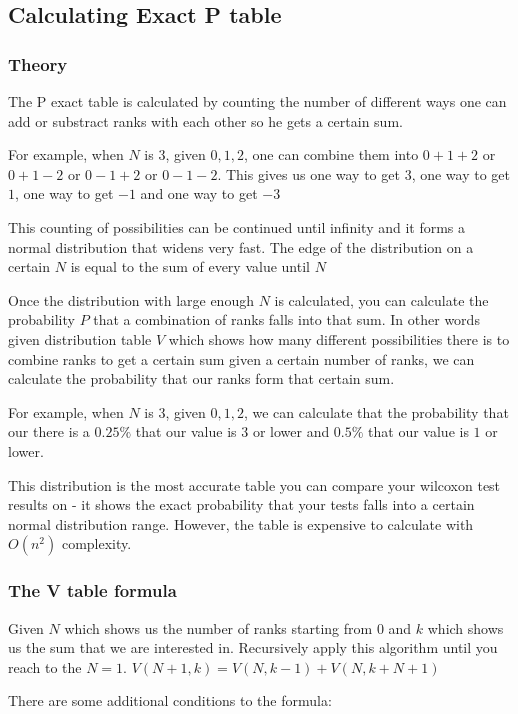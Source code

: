 \documentclass[12pt]{article}
\begin{document}
\subsection{Calculating Exact P table}
\subsubsection{Theory}
The P exact table is calculated by counting the number of different ways one can add or substract ranks with each other so he gets a certain sum.

For example, when $N$ is $3$, given ${0, 1, 2}$, one can combine them into $0 + 1 + 2$ or $0 + 1 - 2$ or $0 - 1 + 2$ or $0 - 1 - 2$. This gives us one way to get $3$, one way to get $1$, one way to get $-1$ and one way to get $-3$

This counting of possibilities can be continued until infinity and it forms a normal distribution that widens very fast. The edge of the distribution on a certain $N$ is equal to the sum of every value until $N$

Once the distribution with large enough $N$ is calculated, you can calculate the probability $P$ that a combination of ranks falls into that sum. In other words given distribution table $V$ which shows how many different possibilities there is to combine ranks to get a certain sum given a certain number of ranks, we can calculate the probability that our ranks form that certain sum.

For example, when $N$ is $3$, given $0, 1, 2$, we can calculate that the probability that our there is a $0.25\%$ that our value is $3$ or lower and $0.5\%$ that our value is $1$ or lower.

This distribution is the most accurate table you can compare your wilcoxon test results on - it shows the exact probability that your tests falls into a certain normal distribution range. However, the table is expensive to calculate with $O(n^2)$ complexity.

\subsubsection{The V table formula}
Given $N$ which shows us the number of ranks starting from $0$ and $k$ which shows us the sum that we are interested in. Recursively apply this algorithm until you reach to the $N = 1$.
$V(N+1, k) = V(N, k-1) + V(N, k+N+1)$

There are some additional conditions to the formula:
\end{document}
